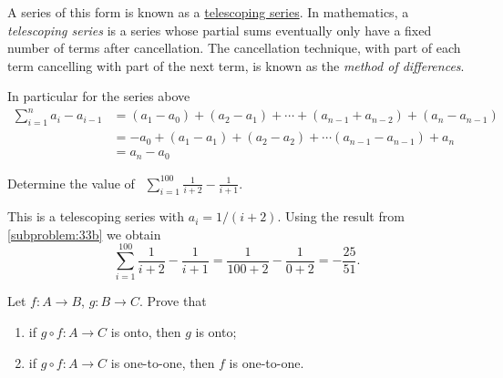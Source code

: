 \documentclass[a4paper, english, 12pt]{article} %
\begin{document}
\begin{answer}
  A series of this form is known as a
  \href{https://en.wikipedia.org/wiki/Telescoping_series}{telescoping series}.
  In mathematics, a \emph{telescoping series} is a series whose partial sums
  eventually only have a fixed number of terms after cancellation. The
  cancellation technique, with part of each term cancelling with part of the
  next term, is known as the \emph{method of differences}.

  In particular for the series above
  \begin{align*}
    \sum_{i = 1}^{n} a_i - a_{i - 1}
    & = (a_1 - a_0) + (a_2 - a_1) + \cdots + (a_{n-1} + a_{n-2}) + (a_{n} - a_{n-1}) \\
    & = - a_0 + (a_1 - a_1) + (a_2 - a_ 2) + \cdots (a_{n-1} - a_{n-1}) + a_n  \\
    & = a_n - a_0
  \end{align*}
\end{answer}

\begin{subproblem}
  Determine the value of $ \ \ \displaystyle \sum_{i = 1}^{100} \frac{1}{i + 2} -
  \frac{1}{i + 1}$.
\end{subproblem}

\begin{answer}
  \noindent
  This is a telescoping series with $a_i = 1/(i + 2)$. Using the result from
  \cref{subproblem:33b} we obtain
  \begin{equation*}
        \sum_{i = 1}^{100} \frac{1}{i+2} - \frac{1}{i+1}
    =   \frac{1}{100 + 2} - \frac{1}{0 + 2}
    = - \frac{25}{51}.
  \end{equation*}
\end{answer}



\begin{problem}[8]
  Let $f \colon A \to B$, $g \colon B \to C$. Prove that
  \begin{enumerate}[label = (\alph*)]
    \item if $g \circ f \colon A \to C$ is onto, then $g$ is onto;
    \item if $g \circ f \colon A \to C$ is one-to-one, then $f$ is one-to-one.
  \end{enumerate}
\end{problem}
\end{document}
